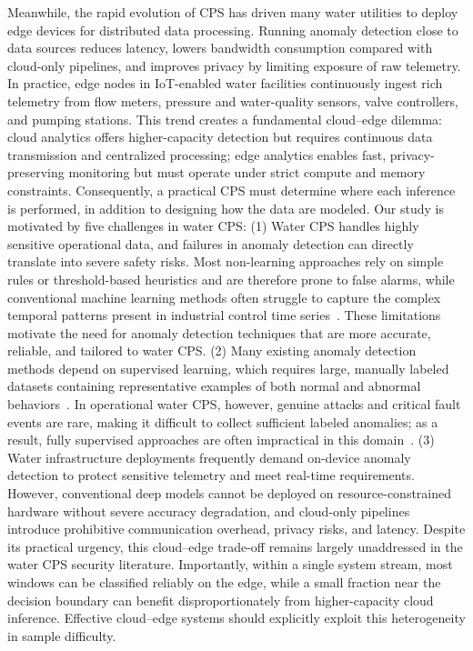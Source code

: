 \documentclass[pdflatex,sn-mathphys-num]{sn-jnl}%
\theoremstyle{thmstyleone}
\theoremstyle{thmstyletwo}%
\theoremstyle{thmstylethree}%
\begin{document}
Meanwhile, the rapid evolution of CPS has driven many water utilities to deploy edge devices for distributed data processing. Running anomaly detection close to data sources reduces latency, lowers bandwidth consumption compared with cloud-only pipelines, and improves privacy by limiting exposure of raw telemetry. In practice, edge nodes in IoT-enabled water facilities continuously ingest rich telemetry from flow meters, pressure and water-quality sensors, valve controllers, and pumping stations. This trend creates a fundamental cloud--edge dilemma: cloud analytics offers higher-capacity detection but requires continuous data transmission and centralized processing; edge analytics enables fast, privacy-preserving monitoring but must operate under strict compute and memory constraints. Consequently, a practical CPS must determine where each inference is performed, in addition to designing how the data are modeled. Our study is motivated by five challenges in water CPS:
(1) Water CPS handles highly sensitive operational data, and failures in anomaly detection can directly translate into severe safety risks. Most non-learning approaches rely on simple rules or threshold-based heuristics and are therefore prone to false alarms, while conventional machine learning methods often struggle to capture the complex temporal patterns present in industrial control time series~\cite{inoue2017anomaly,mathur2016swat}. These limitations motivate the need for anomaly detection techniques that are more accurate, reliable, and tailored to water CPS.
(2) Many existing anomaly detection methods depend on supervised learning, which requires large, manually labeled datasets containing representative examples of both normal and abnormal behaviors~\cite{dehlaghi2023anomaly}. In operational water CPS, however, genuine attacks and critical fault events are rare, making it difficult to collect sufficient labeled anomalies; as a result, fully supervised approaches are often impractical in this domain~\cite{chalapathy2019deep}.
(3) Water infrastructure deployments frequently demand on-device anomaly detection to protect sensitive telemetry and meet real-time requirements. However, conventional deep models cannot be deployed on resource-constrained hardware without severe accuracy degradation, and cloud-only pipelines introduce prohibitive communication overhead, privacy risks, and latency. Despite its practical urgency, this cloud--edge trade-off remains largely unaddressed in the water CPS security literature. Importantly, within a single system stream, most windows can be classified reliably on the edge, while a small fraction near the decision boundary can benefit disproportionately from higher-capacity cloud inference. Effective cloud--edge systems should explicitly exploit this heterogeneity in sample difficulty.
\end{document}
